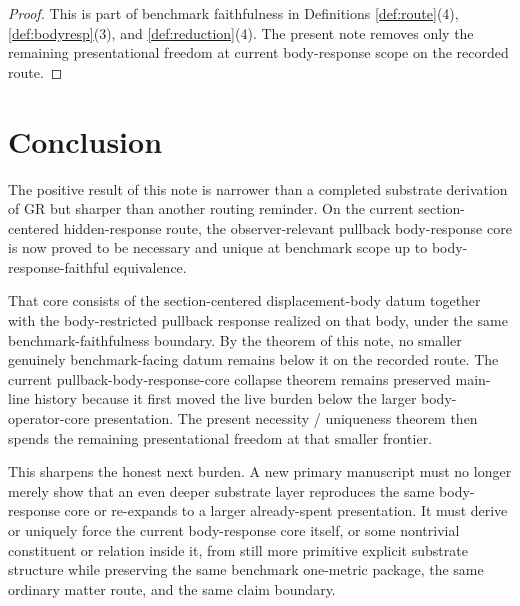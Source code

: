 \documentclass[11pt]{article}
\begin{document}
\begin{proof}
This is part of benchmark faithfulness in Definitions \ref{def:route}(4), \ref{def:bodyresp}(3), and \ref{def:reduction}(4). The present note removes only the remaining presentational freedom at current body-response scope on the recorded route.
\end{proof}

\section{Conclusion}

The positive result of this note is narrower than a completed substrate derivation of GR but sharper than another routing reminder. On the current section-centered hidden-response route, the observer-relevant pullback body-response core is now proved to be necessary and unique at benchmark scope up to body-response-faithful equivalence.

That core consists of the section-centered displacement-body datum together with the body-restricted pullback response realized on that body, under the same benchmark-faithfulness boundary. By the theorem of this note, no smaller genuinely benchmark-facing datum remains below it on the recorded route. The current pullback-body-response-core collapse theorem remains preserved main-line history because it first moved the live burden below the larger body-operator-core presentation. The present necessity / uniqueness theorem then spends the remaining presentational freedom at that smaller frontier.

This sharpens the honest next burden. A new primary manuscript must no longer merely show that an even deeper substrate layer reproduces the same body-response core or re-expands to a larger already-spent presentation. It must derive or uniquely force the current body-response core itself, or some nontrivial constituent or relation inside it, from still more primitive explicit substrate structure while preserving the same benchmark one-metric package, the same ordinary matter route, and the same claim boundary.
\end{document}
